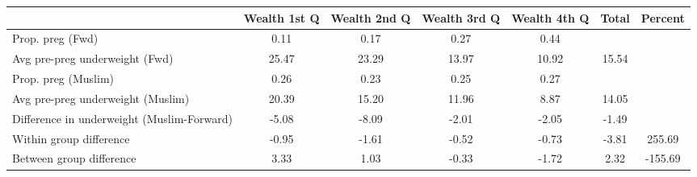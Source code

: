 \begin{tabular}{l*{6}{c}}
\toprule
            &\multicolumn{1}{c}{Wealth 1st Q}&\multicolumn{1}{c}{Wealth 2nd Q}&\multicolumn{1}{c}{Wealth 3rd Q}&\multicolumn{1}{c}{Wealth 4th Q}&\multicolumn{1}{c}{Total}&\multicolumn{1}{c}{Percent}\\
\midrule
\midrule
Prop. preg (Fwd)&        0.11&        0.17&        0.27&        0.44&            &            \\
Avg pre-preg underweight (Fwd)&       25.47&       23.29&       13.97&       10.92&       15.54&            \\
Prop. preg (Muslim)&        0.26&        0.23&        0.25&        0.27&            &            \\
Avg pre-preg underweight (Muslim)&       20.39&       15.20&       11.96&        8.87&       14.05&            \\
Difference in underweight (Muslim-Forward)&       -5.08&       -8.09&       -2.01&       -2.05&       -1.49&            \\
Within group difference&       -0.95&       -1.61&       -0.52&       -0.73&       -3.81&      255.69\\
Between group difference&        3.33&        1.03&       -0.33&       -1.72&        2.32&     -155.69\\
\bottomrule
\end{tabular}
